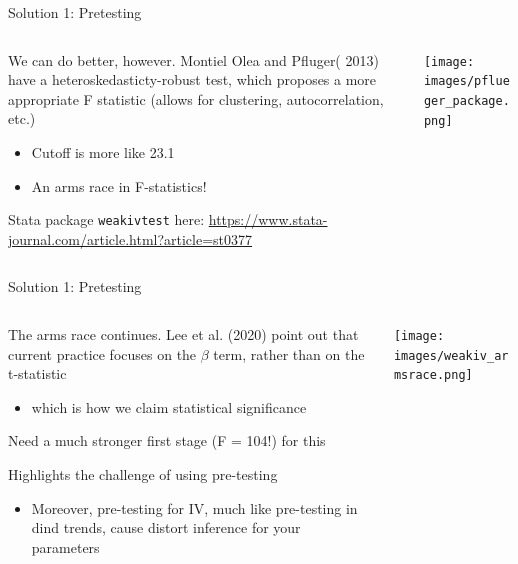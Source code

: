 \documentclass[notes,11pt, aspectratio=169]{beamer}
\newenvironment{wideitemize}{\itemize\addtolength{\itemsep}{10pt}}{\enditemize}
\begin{document}
\begin{frame}{Solution 1: Pretesting}
  \begin{columns}[T] %
    \begin{column}{0.5\textwidth}
      \begin{wideitemize}
      \item We can do better, however. Montiel Olea and Pfluger( 2013) have a heteroskedasticty-robust test, which proposes a more appropriate F statistic (allows for clustering, autocorrelation, etc.)
        \begin{itemize}
        \item Cutoff is more like 23.1
        \item An arms race in F-statistics!
        \end{itemize}
      \item Stata package \texttt{weakivtest} here: \url{https://www.stata-journal.com/article.html?article=st0377}
      \end{wideitemize}
    \end{column}
    \begin{column}{0.5\textwidth}
       \texttt{[image: images/pflueger\_package.png]}
    \end{column}
  \end{columns}
\end{frame}


\begin{frame}{Solution 1: Pretesting}
  \begin{columns}[T] %
    \begin{column}{0.5\textwidth}
      \begin{wideitemize}
      \item The arms race continues. Lee et al. (2020) point out that
        current practice focuses on the $\beta$ term, rather than on
        the t-statistic
        \begin{itemize}
        \item which is how we claim statistical
        significance
        \end{itemize}
      \item Need a much stronger first stage (F = 104!) for this
      \item Highlights the challenge of using pre-testing
        \begin{itemize}
        \item Moreover, pre-testing for IV, much like pre-testing in
          dind trends, cause distort inference for your parameters
        \end{itemize}
      \end{wideitemize}
    \end{column}
    \begin{column}{0.5\textwidth}
       \texttt{[image: images/weakiv\_armsrace.png]}
    \end{column}
  \end{columns}
\end{frame}
\end{document}
